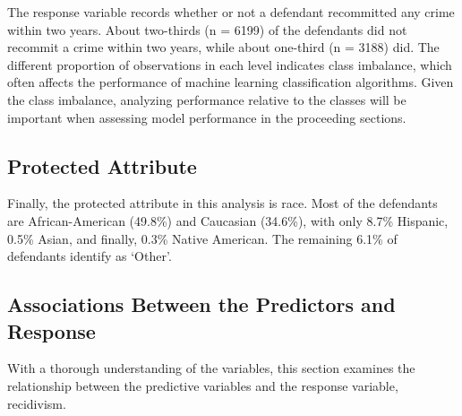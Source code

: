 \documentclass[12pt, twoside]{amherstthesis}
\begin{document}
The response variable records whether or not a defendant recommitted any crime within two years. About two-thirds (n = 6199) of the defendants did not recommit a crime within two years, while about one-third (n = 3188) did. The different proportion of observations in each level indicates class imbalance, which often affects the performance of machine learning classification algorithms. Given the class imbalance, analyzing performance relative to the classes will be important when assessing model performance in the proceeding sections.

\hypertarget{protectedattribute}{%
\subsection{Protected Attribute}\label{protectedattribute}}

Finally, the protected attribute in this analysis is race. Most of the defendants are African-American (49.8\%) and Caucasian (34.6\%), with only 8.7\% Hispanic, 0.5\% Asian, and finally, 0.3\% Native American. The remaining 6.1\% of defendants identify as `Other'.

\hypertarget{bivariateanalysis}{%
\subsection{Associations Between the Predictors and Response}\label{bivariateanalysis}}

With a thorough understanding of the variables, this section examines the relationship between the predictive variables and the response variable, recidivism.
\end{document}
